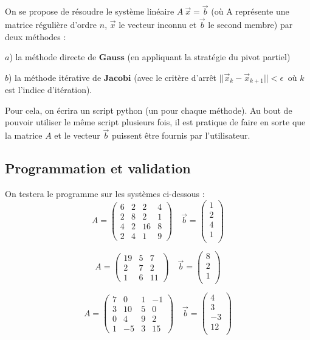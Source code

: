 \documentclass{article}
\begin{document}
    On se propose de résoudre le système linéaire \(A\ \vec{x}=\vec{b}\) (où
A représente une matrice régulière d'ordre \(n\), \(\vec{x}\) le vecteur
inconnu et \(\vec{b}\) le second membre) par deux méthodes :

\(a\)) la méthode directe de \(\textbf{Gauss}\) (en appliquant la
stratégie du pivot partiel)

\(b\)) la méthode itérative de \(\textbf{Jacobi}\) (avec le critère
d'arrêt \(|| \vec{x}_{k} - \vec{x}_{k+1} || < \epsilon\ \) où \(k\) est
l'indice d'itération).

Pour cela, on écrira un script python (un pour chaque méthode). Au bout
de pouvoir utiliser le même script plusieurs fois, il est pratique de
faire en sorte que la matrice \(A\) et le vecteur \(\vec{b}\) puissent
être fournis par l'utilisateur.


    \subsection{Programmation et validation}


    On testera le programme sur les systèmes ci-dessous : \[
{A}= 
\left( \begin{array}{cccc}
6 & 2 & 2 & 4 \\
2 & 8 & 2 & 1 \\
4 & 2 & 16 & 8\\
2 & 4 & 1 & 9
\end{array} \right)
\quad 
\vec{b} =
\left( \begin{array}{c}
1 \\
2 \\
4 \\
1 \\
\end{array} \right)
\]

\[
{A}= 
\left( \begin{array}{ccc}
19 & 5 & 7 \\
2 & 7 & 2 \\
1 & 6 & 11 
\end{array} \right)
\quad 
\vec{b} =
\left( \begin{array}{c}
8 \\
2 \\
1 \\
\end{array} \right)
\]

\[
{A}= 
\left( \begin{array}{cccc}
7 & 0 & 1 & -1 \\
3 & 10 & 5 & 0 \\
0 & 4 & 9 & 2\\
1 & -5 & 3 & 15
\end{array} \right)
\quad 
\vec{b} =
\left( \begin{array}{c}
4 \\
3 \\
-3 \\
12 \\
\end{array} \right)
\]
\end{document}
